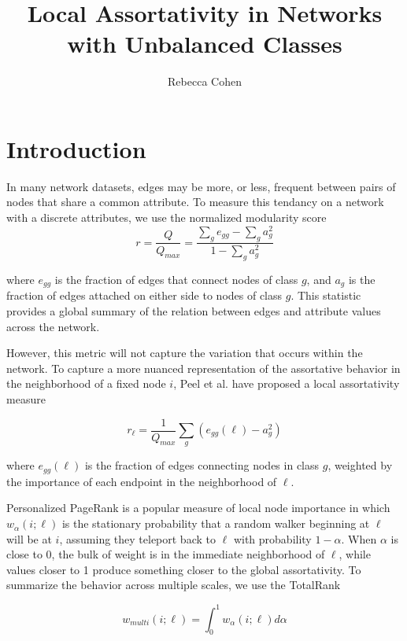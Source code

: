 \documentclass[12pt]{article}
\title{Local Assortativity in Networks with Unbalanced Classes}
\author{Rebecca Cohen}
\begin{document}
\maketitle
\section{Introduction}

In many network datasets, edges may be more, or less, frequent between pairs of nodes that share a common attribute.  To measure this tendancy on a network with a discrete attributes, we use the normalized modularity score
 \begin{equation}
   r = \frac{Q}{Q_{max}} = \frac{\sum_g e_{gg} - \sum_g a_g^2} {1 - \sum_g a_g^2}
 \end{equation} \cite{newman:2003}
 
 where $e_{gg}$ is the fraction of edges that connect nodes of class $g$, and $a_g$ is the fraction of edges attached on either side to nodes of class $g$.  This statistic provides a global summary of the relation between edges and attribute values across the network.  
 
However, this metric will not capture the variation that occurs within the network.  To capture a more nuanced representation of the assortative behavior in the neighborhood of a fixed node $i$, Peel et al. have proposed a local assortativity measure

\begin{equation}
  r_\ell = \frac{1}{Q_{max}} \sum_g (e_{gg}(\ell) - a_g^2)
\end{equation}

where $e_{gg}(\ell)$ is the fraction of edges connecting nodes in class $g$, weighted by the importance of each endpoint in the neighborhood of $\ell$.  

Personalized PageRank is a popular measure of local node importance in which $w_\alpha(i; \ell)$ is the stationary probability that a random walker beginning at $\ell$ will be at $i$, assuming they teleport back to $\ell$ with probability $1-\alpha$.  When $\alpha$ is close to 0, the bulk of weight is in the immediate neighborhood of $\ell$, while values closer to 1 produce something closer to the global assortativity.  To summarize the behavior across multiple scales, we use the TotalRank

\begin{equation}
  w_{multi}(i; \ell) = \int_0^1 w_\alpha(i; \ell) d\alpha
\end{equation} \cite{boldi:2005} \cite{Peel:2018}
\end{document}
